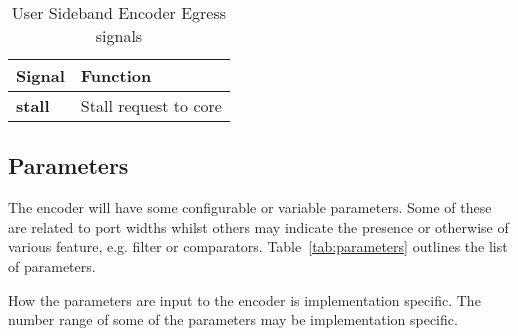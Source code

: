 \begin{table}[htp]
    \centering
    \caption{User Sideband Encoder Egress signals}
    \label{tab:engress-side-band}
    \begin{tabulary}{\textwidth}{|l|l|}
        \hline
        \textbf {Signal} & \textbf {Function} \\
        \hline
        \textbf {stall}& Stall request to core \\
        \hline
    \end{tabulary}
\end{table}


\subsection {Parameters}

The encoder will have some configurable or variable parameters. Some
of these are related to port widths whilst others may indicate the
presence or otherwise of various feature, e.g. filter or comparators.
Table~\ref{tab:parameters} outlines the list of parameters.

How the parameters are input to the encoder is implementation specific. The number range of some of the parameters  may be implementation specific. 


